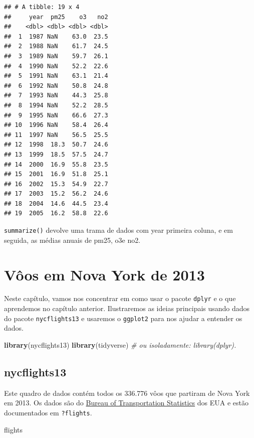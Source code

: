 \documentclass[]{book}
\newenvironment{Shaded}{\begin{snugshade}}{\end{snugshade}}
\newcommand{\CommentTok}[1]{\textcolor[rgb]{0.56,0.35,0.01}{\textit{#1}}}
\newcommand{\KeywordTok}[1]{\textcolor[rgb]{0.13,0.29,0.53}{\textbf{#1}}}
\newcommand{\NormalTok}[1]{#1}
\begin{document}
\begin{verbatim}
## # A tibble: 19 x 4
##     year  pm25    o3   no2
##    <dbl> <dbl> <dbl> <dbl>
##  1  1987 NaN    63.0  23.5
##  2  1988 NaN    61.7  24.5
##  3  1989 NaN    59.7  26.1
##  4  1990 NaN    52.2  22.6
##  5  1991 NaN    63.1  21.4
##  6  1992 NaN    50.8  24.8
##  7  1993 NaN    44.3  25.8
##  8  1994 NaN    52.2  28.5
##  9  1995 NaN    66.6  27.3
## 10  1996 NaN    58.4  26.4
## 11  1997 NaN    56.5  25.5
## 12  1998  18.3  50.7  24.6
## 13  1999  18.5  57.5  24.7
## 14  2000  16.9  55.8  23.5
## 15  2001  16.9  51.8  25.1
## 16  2002  15.3  54.9  22.7
## 17  2003  15.2  56.2  24.6
## 18  2004  14.6  44.5  23.4
## 19  2005  16.2  58.8  22.6
\end{verbatim}

\texttt{summarize()} devolve uma trama de dados com year primeira coluna, e em seguida, as médias anuais de pm25, o3e no2.

\hypertarget{application}{%
\chapter{Vôos em Nova York de 2013}\label{application}}

Neste capítulo, vamos nos concentrar em como usar o pacote \texttt{dplyr} e o que aprendemos no capítulo anterior. Ilustraremos as ideias principais usando dados do pacote \texttt{nycflights13} e usaremos o \texttt{ggplot2} para nos ajudar a entender os dados.

\begin{Shaded}
\begin{Highlighting}[]
\KeywordTok{library}\NormalTok{(nycflights13)}
\KeywordTok{library}\NormalTok{(tidyverse) }\CommentTok{# ou isoladamente: library(dplyr).}
\end{Highlighting}
\end{Shaded}

\hypertarget{nycflights13}{%
\section{nycflights13}\label{nycflights13}}

Este quadro de dados contém todos os 336.776 vôos que partiram de Nova York em 2013. Os dados são do \href{https://www.transtats.bts.gov/DatabaseInfo.asp?DB_ID=120\&Link=0}{Bureau of Transportation Statistics} dos EUA e estão documentados em \texttt{?flights}.

\begin{Shaded}
\begin{Highlighting}[]
\NormalTok{flights}
\end{Highlighting}
\end{Shaded}
\end{document}
